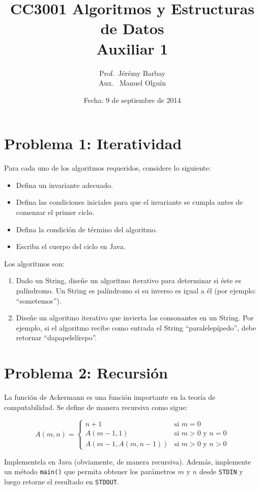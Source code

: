 \documentclass[11pt,spanish]{article}
\begin{document}
\title{\vspace*{-3cm}CC3001 Algoritmos y Estructuras de Datos
\\Auxiliar 1
}
\author{
Prof.\ Jérémy Barbay
\\Aux. \ Manuel Olguín
}

\date{Fecha: 9 de septiembre de 2014}

\maketitle
\thispagestyle{empty}

\section*{Problema 1: Iteratividad}

Para cada uno de los algoritmos requeridos, considere lo siguiente:

\begin{itemize}
  \item Defina un invariante adecuado.
  \item Defina las condiciones iniciales para que el invariante se cumpla antes de comenzar el primer ciclo.
  \item Defina la condición de término del algoritmo.
  \item Escriba el cuerpo del ciclo en Java.
\end{itemize}

Los algoritmos son:

\begin{enumerate}
 \item Dado un String, diseñe un algoritmo iterativo para determinar si éste es palíndromo. Un String es palíndromo si su inverso es igual a él (por ejemplo: ``sometemos'').
 \item Diseñe un algoritmo iterativo que invierta las consonantes en un String. Por ejemplo, si el algoritmo recibe como entrada el String ``paralelepípedo'', debe retornar ``dapapelelírepo''.
\end{enumerate}

\section*{Problema 2: Recursión}

La función de Ackermann es una función importante en la teoría de computabilidad. Se define de manera recursiva como sigue:

\[ A(m,n) =
\begin{cases}
    n+1& \text{si } m = 0\\
    A(m-1, 1)& \text{si } m > 0 \text{ y } n = 0\\
    A(m-1, A(m, n-1))& \text{si } m > 0 \text{ y } n > 0
\end{cases}
\]

Implementela en Java (obviamente, de manera recursiva). Además, implemente un método \texttt{main()} que permita obtener los parámetros $m$ y $n$ desde \texttt{STDIN} y luego retorne el resultado en \texttt{STDOUT}.
\end{document}
